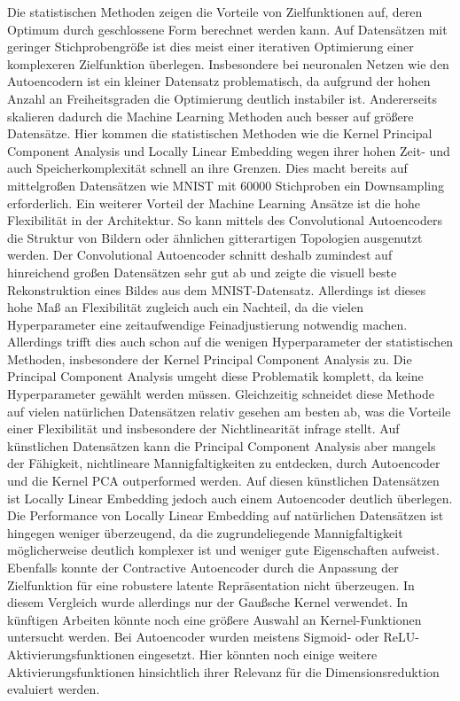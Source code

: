 Die statistischen Methoden zeigen die Vorteile von Zielfunktionen auf, deren Optimum durch
geschlossene Form berechnet werden kann. Auf Datensätzen mit geringer Stichprobengröße ist dies
meist einer iterativen Optimierung einer komplexeren Zielfunktion überlegen. Insbesondere bei
neuronalen Netzen wie den Autoencodern ist ein kleiner Datensatz problematisch, da aufgrund der
hohen Anzahl an Freiheitsgraden die Optimierung deutlich instabiler ist. Andererseits skalieren
dadurch die Machine Learning Methoden auch besser auf größere Datensätze. Hier kommen die
statistischen Methoden wie die Kernel Principal Component Analysis und Locally Linear Embedding
wegen ihrer hohen Zeit- und auch Speicherkomplexität schnell an ihre Grenzen. Dies macht bereits
auf mittelgroßen Datensätzen wie MNIST mit \num{60000} Stichproben ein Downsampling erforderlich.
Ein weiterer Vorteil der Machine Learning Ansätze ist die hohe Flexibilität in der Architektur. So
kann mittels des Convolutional Autoencoders die Struktur von Bildern oder ähnlichen gitterartigen
Topologien ausgenutzt werden. Der Convolutional Autoencoder schnitt deshalb zumindest auf
hinreichend großen Datensätzen sehr gut ab und zeigte die visuell beste Rekonstruktion eines Bildes
aus dem MNIST-Datensatz. Allerdings ist dieses hohe Maß an Flexibilität zugleich auch ein Nachteil,
da die vielen Hyperparameter eine zeitaufwendige Feinadjustierung notwendig machen. Allerdings
trifft dies auch schon auf die wenigen Hyperparameter der statistischen Methoden, insbesondere der
Kernel Principal Component Analysis zu. Die Principal Component Analysis umgeht diese Problematik
komplett, da keine Hyperparameter gewählt werden müssen. Gleichzeitig schneidet diese Methode auf
vielen natürlichen Datensätzen relativ gesehen am besten ab, was die Vorteile einer Flexibilität
und insbesondere der Nichtlinearität infrage stellt. Auf künstlichen Datensätzen kann die Principal
Component Analysis aber mangels der Fähigkeit, nichtlineare Mannigfaltigkeiten zu entdecken, durch
Autoencoder und die Kernel PCA outperformed werden. Auf diesen künstlichen Datensätzen ist Locally
Linear Embedding jedoch auch einem Autoencoder deutlich überlegen. Die Performance von Locally
Linear Embedding auf natürlichen Datensätzen ist hingegen weniger überzeugend, da die
zugrundeliegende Mannigfaltigkeit möglicherweise deutlich komplexer ist und weniger gute
Eigenschaften aufweist. Ebenfalls konnte der Contractive Autoencoder durch die Anpassung der
Zielfunktion für eine robustere latente Repräsentation nicht überzeugen. In diesem Vergleich wurde
allerdings nur der Gaußsche Kernel verwendet. In künftigen Arbeiten könnte noch eine größere
Auswahl an Kernel-Funktionen untersucht werden. Bei Autoencoder wurden meistens Sigmoid- oder
ReLU-Aktivierungsfunktionen eingesetzt. Hier könnten noch einige weitere Aktivierungsfunktionen
hinsichtlich ihrer Relevanz für die Dimensionsreduktion evaluiert werden.

